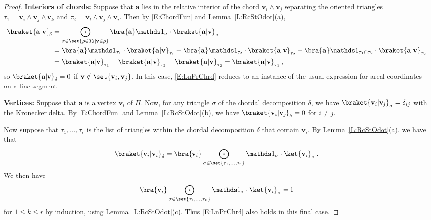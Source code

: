 \documentclass[12pt]{amsart}
\theoremstyle{plain}
\theoremstyle{definition}
\numberwithin{equation}{section}
\begin{document}
\begin{proof}
\vskip 2mm
\noindent
\textbf{Interiors of chords:}
Suppose that $\mathbf a$ lies in the relative interior of the chord $\mathbf v_i\wedge \mathbf v_j$ separating the oriented triangles $\tau_1=\mathbf v_i\wedge \mathbf v_j\wedge \mathbf v_k$ and $\tau_2=\mathbf v_l\wedge \mathbf v_j\wedge \mathbf v_i$. Then by \eqref{E:ChordFun} and Lemma~\ref{L:RcStOdot}(a),
\begin{align*}
\braket{\mathbf a|\mathbf v}_\delta
&
=
\bigodot_{\sigma\in\set{\rho\in T_\delta|\mathbf v\in\rho}}\bra{\mathbf a}\mathds 1_\sigma\cdot\braket{\mathbf a|\mathbf v}_\sigma
\\
&
=
\bra{\mathbf a}\mathds1_{\tau_1}\cdot\braket{\mathbf a|\mathbf v}_{\tau_1}
+
\bra{\mathbf a}\mathds1_{\tau_2}\cdot\braket{\mathbf a|\mathbf v}_{\tau_2}
-
\bra{\mathbf a}\mathds1_{\tau_1\cap\tau_2}\cdot\braket{\mathbf a|\mathbf v}_{\tau_2}
\\
&
=
\braket{\mathbf a|\mathbf v}_{\tau_1}
+
\braket{\mathbf a|\mathbf v}_{\tau_2}
-
\braket{\mathbf a|\mathbf v}_{\tau_2}
=\braket{\mathbf a|\mathbf v}_{\tau_1}
\,,
\end{align*}
so $\braket{\mathbf a|\mathbf v}_\delta=0$ if $\mathbf v\notin\set{\mathbf v_i,\mathbf v_j}$. In this case, \eqref{E:LnPrChrd} reduces to an instance of the usual expression for areal coordinates on a line segment.


\vskip 2mm
\noindent
\textbf{Vertices:}
Suppose that $\mathbf a$ is a vertex $\mathbf v_i$ of $\Pi$. Now, for any triangle $\sigma$ of the chordal decomposition $\delta$, we have $\braket{\mathbf v_i|\mathbf v_j}_\sigma=\delta_{ij}$ with the Kronecker delta. By \eqref{E:ChordFun} and Lemma~\ref{L:RcStOdot}(b), we have $\braket{\mathbf v_i|\mathbf v_j}_\delta=0$ for $i\ne j$.


Now suppose that $\tau_1,\dots,\tau_r$ is the list of triangles within the chordal decomposition $\delta$ that contain $\mathbf v_i$. By Lemma~\ref{L:RcStOdot}(a), we have that
$$
\braket{\mathbf v_i|\mathbf v_i}_\delta=
\bra{\mathbf v_i}\bigodot_{\sigma\in\set{\tau_1,\dots,\tau_r}}\mathds 1_\sigma\cdot\ket{\mathbf v_i}_\sigma\,.
$$
We then have
$$
\bra{\mathbf v_i}\bigodot_{\sigma\in\set{\tau_1,\dots,\tau_k}}\mathds 1_\sigma\cdot\ket{\mathbf v_i}_\sigma=1
$$
for $1\le k\le r$ by induction, using Lemma~\ref{L:RcStOdot}(c). Thus \eqref{E:LnPrChrd} also holds in this final case.
\end{proof}
\end{document}
